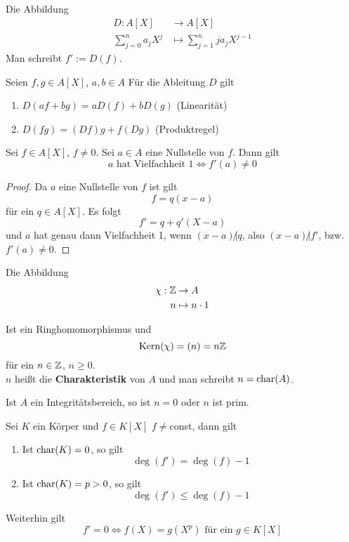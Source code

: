 	\begin{definition}
		Die Abbildung
		\begin{align*}
		D: A[X]&\to A[X]\\
		\sum_{j=0}^{n}a_jX^j&\mapsto\sum_{j=1}^n ja_jX^{j-1}
		\end{align*}
		Man schreibt $f':=D(f)$.
	\end{definition}
	\begin{lem}
		Seien $f,g\in A[X]$, $a,b\in A$
		Für die Ableitung $D$ gilt
		\begin{enumerate}
			\item $D(af+bg)=aD(f)+bD(g)$ (Linearität)
			\item $D(fg)=(Df)g+f(Dg)$ (Produktregel)
		\end{enumerate}
	\end{lem}

	\begin{satz}
		Sei $f\in A[X]$, $f\neq 0$. Sei $a\in A$ eine Nullstelle von $f$. Dann gilt
		\[\text{$a$ hat Vielfachheit $1$}\Leftrightarrow f'(a)\neq 0\]
	\end{satz}
	\begin{proof}
		Da $a$ eine Nullstelle von $f$ ist gilt
		\[f=q(x-a)\]
		für ein $q\in A[X]$. Es folgt
		\[f'=q+q'(X-a)\]
		und $a$ hat genau dann Vielfachheit 1, wenn $(x-a)\not| q$, also $(x-a)\not | f'$, bzw. $f'(a)\neq 0$.
	\end{proof}

	\begin{definition}
		Die Abbildung
		\begin{align*}
		\chi:\mathbb{Z}&\to A\\
		n&\mapsto n\cdot 1
		\end{align*}
		
			Ist ein Ringhomomorphismus und
		\[\operatorname{Kern}(\chi)=(n)=n\mathbb{Z}\]
		für ein $n\in\mathbb{Z}$, $n\geq 0$.\\
		$n$ heißt die \textbf{Charakteristik} von $A$ und man schreibt $n=\operatorname{char}(A)$.
	\end{definition}

	\begin{lem}
		Ist $A$ ein Integritätsbereich, so ist $n=0$ oder $n$ ist prim.
	\end{lem}
	
	\begin{satz}
		Sei $K$ ein Körper und $f\in K[X]$ $f\neq $const, dann gilt
		\begin{enumerate}
			\item Ist $\operatorname{char}(K)=0$, so gilt 
			\[\deg(f')=\deg(f)-1\]
			\item Ist $\operatorname{char}(K)=p>0$, so gilt
			\[\deg(f')\leq \deg(f)-1\]
		\end{enumerate}
		Weiterhin gilt
		\[f'=0\Leftrightarrow f(X)=g(X^p)\text{ für ein $g\in K[X]$}\]
	\end{satz}

